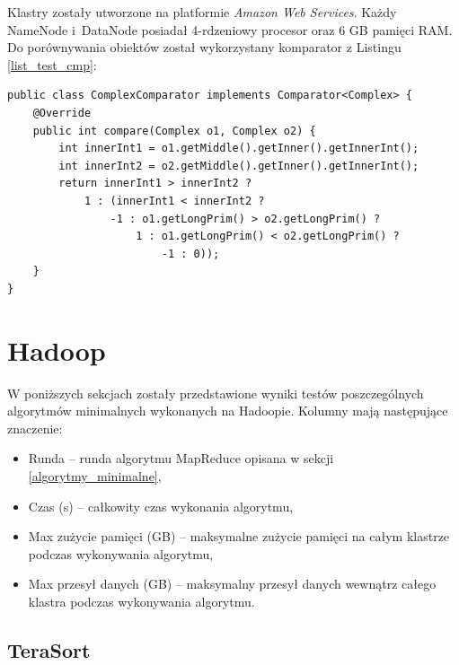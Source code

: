 \documentclass[magisterska]{pracamgr}
\begin{document}
Klastry zostały utworzone na platformie \textit{Amazon Web Services}. Każdy NameNode \mbox{i DataNode} posiadał 4-rdzeniowy procesor oraz 6 GB pamięci RAM. Do porównywania obiektów został wykorzystany komparator z Listingu \ref{list_test_cmp}:
\begin{lstlisting}[language=SmallJava,firstnumber=1,label=list_test_cmp,caption=Komparator obiektów użyty podczas testowania]
public class ComplexComparator implements Comparator<Complex> {
    @Override
    public int compare(Complex o1, Complex o2) {
        int innerInt1 = o1.getMiddle().getInner().getInnerInt();
        int innerInt2 = o2.getMiddle().getInner().getInnerInt();
        return innerInt1 > innerInt2 ?
            1 : (innerInt1 < innerInt2 ?
                -1 : o1.getLongPrim() > o2.getLongPrim() ?
                    1 : o1.getLongPrim() < o2.getLongPrim() ?
                        -1 : 0));
    }
}
\end{lstlisting}

\section{Hadoop}
\setlength{\parindent}{6.5ex}
W poniższych sekcjach zostały przedstawione wyniki testów poszczególnych algorytmów minimalnych wykonanych na Hadoopie. Kolumny mają następujące znaczenie:
\begin{itemize}
    \item Runda -- runda algorytmu MapReduce opisana w sekcji \ref{algorytmy_minimalne},
    \item Czas (s) -- całkowity czas wykonania algorytmu,
    \item Max zużycie pamięci (GB) -- maksymalne zużycie pamięci na całym klastrze podczas wykonywania algorytmu,
    \item Max przesył danych (GB) -- maksymalny przesył danych wewnątrz całego klastra podczas wykonywania algorytmu.
\end{itemize}

\subsection{TeraSort}
\end{document}
